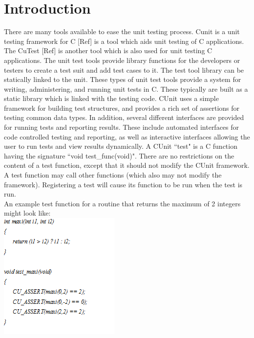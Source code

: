 

\section{Introduction}\vspace{3 mm}

There are many tools available to ease the unit testing process. Cunit is a unit testing framework for C [Ref] is a tool which aids unit testing of C applications.  The CuTest [Ref] is another tool which is also used for unit testing C applications. The unit test tools provide library functions for the developers or testers to create a test suit and add test cases to it. The test tool library can be statically linked to the unit. These types of unit test tools provide a system for writing, administering, and running unit tests in C. These typically are built as a static library which is linked with the testing code. CUnit uses a simple framework for building test structures, and provides a rich set of assertions for testing common data types. In addition, several different interfaces are provided for running tests and reporting results. These include automated interfaces for code controlled testing and reporting, as well as interactive interfaces allowing the user to run tests and view results dynamically. A CUnit ``test"  is a C function having the signature ``void test\_func(void)". There are no restrictions on the content of a test function, except that it should not modify the CUnit framework.  A test function may call other functions (which also may not modify the framework). Registering a test will cause its function to be run when the test is run. \\

An example test function for a routine that returns the maximum of 2 integers might look like: \\

\includegraphics[scale=1]
{fig4}


